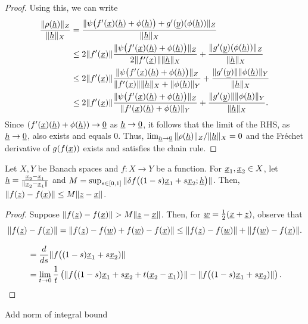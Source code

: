 \begin{proof}
Using this, we can write
\begin{align*}
\frac{\|\rho(\underline{h})\|_Z}{\|\underline{h}\|_X}
&= \frac{\| \psi \big(f'(\underline{x})(\underline{h}) + \phi(\underline{h}) \big) + g'(\underline{y})(\phi(\underline{h})) \|_Z}{\|\underline{h}\|_X} \\
&\leq 2 \|f'(\underline{x})\|  \frac{\| \psi \big(f'(\underline{x})(\underline{h}) + \phi(\underline{h}) \big) \|_Z}{ 2 \|f'(\underline{x})\|  \|\underline{h}\|_X} + \frac{\|  g'(\underline{y})(\phi(\underline{h})) \|_Z}{\|\underline{h}\|_X} \\
& \leq 2 \|f'(\underline{x})\| \frac{\| \psi \big(f'(\underline{x})(\underline{h}) + \phi(\underline{h}) \big) \|_Z}{\|f'(\underline{x})\| \|\underline{h}\|_X + \| \phi(\underline{h}) \|_Y} + \frac{\|  g'(\underline{y})\| \|\phi(\underline{h}) \|_Y}{\|\underline{h}\|_X} \\
& \leq 2 \|f'(\underline{x})\| \frac{\| \psi \big(f'(\underline{x})(\underline{h}) + \phi(\underline{h}) \big) \|_Z}{\|f'(\underline{x}) (\underline{h}) + \phi(\underline{h})\|_Y} + \frac{\|  g'(\underline{y})\| \|\phi(\underline{h}) \|_Y}{\|\underline{h}\|_X}.
\end{align*}
Since $(f'(\underline{x}) (\underline{h}) + \phi(\underline{h})) \to \underline{0}$ as $\underline{h}\to\underline{0}$, it follows that the limit of the RHS, as $\underline{h}\to\underline{0}$, also exists and equals 0.
Thus, $\lim_{\underline{h} \to \underline{0}} \| \rho (\underline{h}) \|_Z / \|\underline{h}\|_X = 0$ and the Fr\'{e}chet derivative of $g(f(\underline{x}))$ exists and satisfies the chain rule.
\end{proof}

\iffalse
\begin{theorem}
Let $X,Y$ be Banach spaces and $f \colon X \rightarrow Y$ be a function.
For $\underline{x}_1,\underline{x}_2 \in X$, let $\underline{h} = \frac{ \underline{x}_2 - \underline{x}_1}{\| \underline{x}_2 - \underline{x}_1 \|}$ and $M = \sup_{s \in [0,1]} \| \delta f \big( (1-s)\underline{x}_1+s\underline{x}_2; \underline{h}\big)\|$.
Then, $\|f(\underline{z})-f(\underline{x})\| \leq M \| \underline{z} - \underline{x}\|$.
\end{theorem}
\begin{proof}
Suppose $\|f(\underline{z})-f(\underline{x})\| > M \| \underline{z} - \underline{x}\|$.
Then, for $\underline{w} = \frac{1}{2}(\underline{x}+\underline{z})$, observe that
\[ \|f(\underline{z})-f(\underline{x})\| =  \|f(\underline{z})-f(\underline{w}) + f(\underline{w})-f(\underline{x})\| \leq 
 \|f(\underline{z})-f(\underline{w})\| + \|f(\underline{w})-f(\underline{x})\|. \] 
 
\begin{align*}
&= \frac{d}{ds} \|f\big((1-s)\underline{x}_1 + s \underline{x}_2 ) \| \\
&= \lim_{t\to 0} \frac{1}{t} \left( \|f\big((1-s)\underline{x}_1 + s \underline{x}_2 + t (\underline{x}_2 - \underline{x}_1) \big) \| - \|f\big((1-s)\underline{x}_1 + s \underline{x}_2 ) \|\right).
\end{align*}

\end{proof}
Add norm of integral bound


